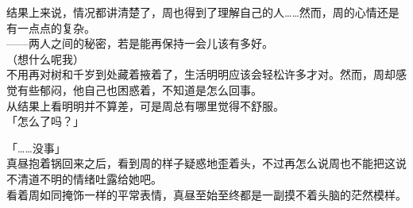 结果上来说，情况都讲清楚了，周也得到了理解自己的人……然而，周的心情还是有一点点的复杂。\\

——两人之间的秘密，若是能再保持一会儿该有多好。\\

（想什么呢我）\\

不用再对树和千岁到处藏着掖着了，生活明明应该会轻松许多才对。然而，周却感觉有些郁闷，他自己也困惑着，不知道是怎么回事。\\

从结果上看明明并不算差，可是周总有哪里觉得不舒服。\\

「怎么了吗？」

「……没事」\\

真昼抱着锅回来之后，看到周的样子疑惑地歪着头，不过再怎么说周也不能把这说不清道不明的情绪吐露给她吧。\\

看着周如同掩饰一样的平常表情，真昼至始至终都是一副摸不着头脑的茫然模样。
